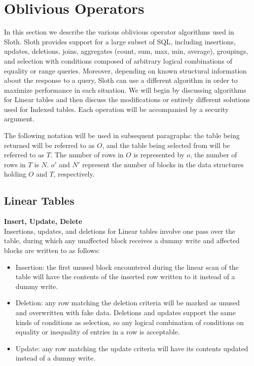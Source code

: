 \documentclass[USenglish,oneside,twocolumn]{article}
\def\name/{Sloth}
\begin{document}
\section{Oblivious Operators}\label{oblivOps}
In this section we describe the various oblivious operator algorithms used in \name/. \name/ provides support for a large subset of SQL, including insertions, updates, deletions, joins, aggregates (count, sum, max, min, average), groupings, and selection with conditions composed of arbitrary logical combinations of equality or range queries. Moreover, depending on known structural information about the response to a query, \name/ can use a different algorithm in order to maximize performance in each situation. We will begin by discussing algorithms for Linear tables and then discuss the modifications or entirely different solutions used for Indexed tables. Each operation will be accompanied by a security argument. 

The following notation will be used in subsequent paragraphs: the table being returned will be referred to as $O$, and the table being selected from will be referred to as $T$. The number of rows in $O$ is represented by $o$, the number of rows in $T$ is $N$. $o'$ and $N'$ represent the number of blocks in the data structures holding $O$ and $T$, respectively. 

\subsection{Linear Tables}
\medskip \noindent \textbf{Insert, Update, Delete}\\
Insertions, updates, and deletions for Linear tables involve one pass over the table, during which any unaffected block receives a dummy write and affected blocks are written to as follows:
\begin{itemize}
\item Insertion: the first unused block encountered during the linear scan of the table will have the contents of the inserted row written to it instead of a dummy write.
\item Deletion: any row matching the deletion criteria will be marked as unused and overwritten with fake data. Deletions and updates support the same kinds of conditions as selection, so any logical combination of conditions on equality or inequality of entries in a row is acceptable. 
\item Update: any row matching the update criteria will have its contents updated instead of a dummy write. 
\end{itemize}
\end{document}

